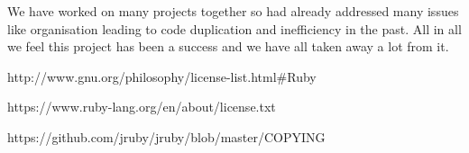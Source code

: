 \documentclass[a4wide, 11pt]{article}
\begin{document}
We have worked on many projects together so had already addressed many issues like organisation leading to code duplication and inefficiency in the past. All in all we feel this project has been a success and we have all taken away a lot from it.

\begin{thebibliography}{9}

  http://www.gnu.org/philosophy/license-list.html\#Ruby

  https://www.ruby-lang.org/en/about/license.txt

  https://github.com/jruby/jruby/blob/master/COPYING
\end{thebibliography}
\end{document}
